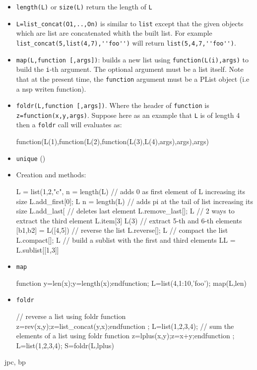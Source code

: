 \begin{itemize}
   \item \verb+length(L)+ or \verb+size(L)+ return the length of \verb+L+
   \item \verb+L=list_concat(O1,..,On)+ is similar to \verb+list+ except that 
     the given objects which are list are concatenated whith the built list. 
     For example \verb+list_concat(5,list(4,7),''foo'')+ will return 
     \verb+list(5,4,7,''foo'')+.
   \item \verb+map(L,function [,args])+: builds a new list using 
     \verb+function(L(i),args)+ to build the \verb+i+-th argument. 
     The optional argument must be a list itself. Note that at the present time,
     the \verb+function+ argument must be a PList object (i.e a nsp writen function).
   \item \verb+foldr(L,function [,args])+. Where the header of \verb+function+ is 
     \verb+z=function(x,y,args)+. Suppose here as an example that \verb+L+ is of 
     length 4 then a \verb+foldr+  call will evaluates as:
     \begin{program}
       function(L(1),function(L(2),function(L(3),L(4),args),args),args)
     \end{program}
   \item \verb+unique+ () 
\end{itemize}

\begin{examples}
  \begin{itemize}
    \item Creation and methods:
    \begin{program}
    L = list(1,2,"c",%
    n = length(L)
    // adds 0 as first element of L increasing its size
    L.add_first[0]; L
    n = length(L)
    // adds pi at the tail of list increasing its size
    L.add_last[%
    // deletes last element
    L.remove_last[]; L
    // 2 ways to extract the third element
    L.item[3]
    L(3)
    // extract 5-th and 6-th elements
    [b1,b2] = L([4,5])
    // reverse the list
    L.reverse[]; L
    // compact the list
    L.compact[]; L
    // build a sublist with the first and third elements
    LL = L.sublist[[1,3]]
  \end{program}
  \item \verb+map+
  \begin{program}
    function y=len(x);y=length(x);endfunction;
    L=list(4,1:10,'foo');
    map(L,len)
  \end{program}
\item \verb+foldr+
  \begin{program}
    // reverse a list using foldr 
    function z=rev(x,y);z=list_concat(y,x);endfunction ;
    L=list(1,2,3,4);
    // sum the elements of a list using foldr 
    function z=lplus(x,y);z=x+y;endfunction ;
    L=list(1,2,3,4);
    S=foldr(L,lplus)
  \end{program}
  \end{itemize}
 \end{examples}

\begin{manseealso}
\end{manseealso}

\begin{authors}
   jpc, bp
\end{authors}
